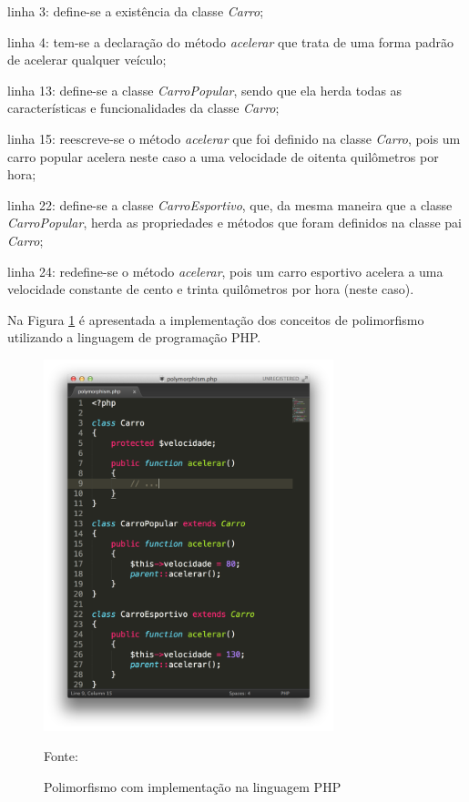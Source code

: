 \begin{alineas}
    \item linha 3: define-se a existência da classe \textit{Carro};
    \item linha 4: tem-se a declaração do método \textit{acelerar} que trata de
    uma forma padrão de acelerar qualquer veículo;
    \item linha 13: define-se a classe \textit{CarroPopular}, sendo que ela
    herda todas as características e funcionalidades da classe \textit{Carro};
    \item linha 15: reescreve-se o método \textit{acelerar} que foi definido na
    classe \textit{Carro}, pois um carro popular acelera neste caso a uma
    velocidade de oitenta quilômetros por hora;
    \item linha 22: define-se a classe \textit{CarroEsportivo}, que, da mesma
    maneira que a classe \textit{CarroPopular}, herda as propriedades e métodos
    que foram definidos na classe pai \textit{Carro};
    \item linha 24: redefine-se o método \textit{acelerar}, pois um carro
    esportivo acelera a uma velocidade constante de cento e trinta quilômetros
    por hora (neste caso).
\end{alineas}

Na Figura \ref{fig:polimorfismo} é apresentada a implementação dos conceitos
de polimorfismo utilizando a linguagem de programação \acs{PHP}.

\begin{figure}[h!tb]
	\caption{Polimorfismo com implementação na linguagem PHP}
	\label{fig:polimorfismo}

	\centering
	\includegraphics[width=0.75\textwidth]{images/polymorphism.png}

	\centering
	\footnotesize Fonte: \fonteOAutor
\end{figure}

